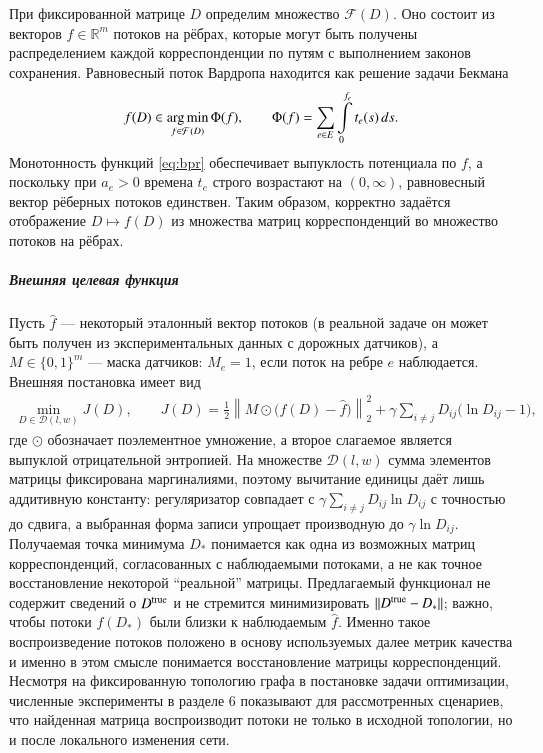 \documentclass{crm-article}
\begin{document}
При фиксированной матрице $D$ определим множество $\mathcal{F}(D)$. Оно состоит из векторов  $f \in \mathbb{R}^m$ потоков на
рёбрах, которые могут быть получены распределением каждой корреспонденции по
путям с выполнением законов сохранения. Равновесный поток Вардропа находится
как решение задачи Бекмана \cite{Beckmann1956}
\begin{gather}
 f(D)\in\mathop{\rm arg\,min}\limits_{f\in\mathcal{F}(D)}
 \Phi(f),\qquad
 \Phi(f)=\sum\limits_{e\in E}\int\limits_{0}^{f_e}t_e(s)\,ds.
 \label{eq:beckmann}
\end{gather}
Монотонность функций \eqref{eq:bpr} обеспечивает выпуклость потенциала по
$f$, а поскольку при $a_e>0$ времена $t_e$ строго возрастают на
$(0,\infty)$, равновесный вектор рёберных потоков единствен. Таким образом,
корректно задаётся отображение $D\mapsto f(D)$ из множества матриц
корреспонденций во множество потоков на рёбрах.

\subparagraph{Внешняя целевая функция}

Пусть $\widehat f$ --- некоторый эталонный вектор потоков (в реальной задаче он может быть получен из экспериментальных данных с дорожных датчиков), а
$M\in\{0,1\}^{m}$ --- маска датчиков: $M_e=1$, если поток на ребре $e$
наблюдается. Внешняя постановка имеет вид
\begin{gather}
 \min\limits_{D\in\mathcal{D}(l,w)} J(D),
 \qquad
 J(D)=\frac{1}{2}\left\|M\odot\bigl(f(D)-\widehat f\bigr)\right\|_2^2
 +\gamma\sum\limits_{i\ne j}D_{ij}\bigl(\ln D_{ij}-1\bigr),
 \label{eq:outer-objective}
\end{gather}
где $\odot$ обозначает поэлементное умножение, а второе
слагаемое является выпуклой отрицательной энтропией. На множестве
$\mathcal{D}(l,w)$ сумма элементов матрицы фиксирована маргиналиями, поэтому
вычитание единицы даёт лишь аддитивную константу: регуляризатор совпадает с
$\gamma\sum_{i\ne j}D_{ij}\ln D_{ij}$ с точностью до сдвига, а выбранная
форма записи упрощает производную до $\gamma\ln D_{ij}$. Получаемая точка
минимума $D_*$ понимается как одна из возможных матриц корреспонденций,
согласованных с наблюдаемыми потоками, а не как точное восстановление некоторой
``реальной'' матрицы. Предлагаемый функционал не содержит сведений о
$D^{\rm true}$ и не стремится минимизировать $\|D^{\rm true}-D_*\|$; важно,
чтобы потоки $f(D_*)$ были близки к наблюдаемым $\widehat f$. Именно такое
воспроизведение потоков положено в основу используемых далее метрик качества и
именно в этом смысле понимается восстановление матрицы корреспонденций.
Несмотря на фиксированную топологию графа в постановке задачи оптимизации,
численные эксперименты в разделе 6 показывают для рассмотренных сценариев, что
найденная матрица воспроизводит потоки не только в исходной топологии, но и
после локального изменения сети.
\end{document}
